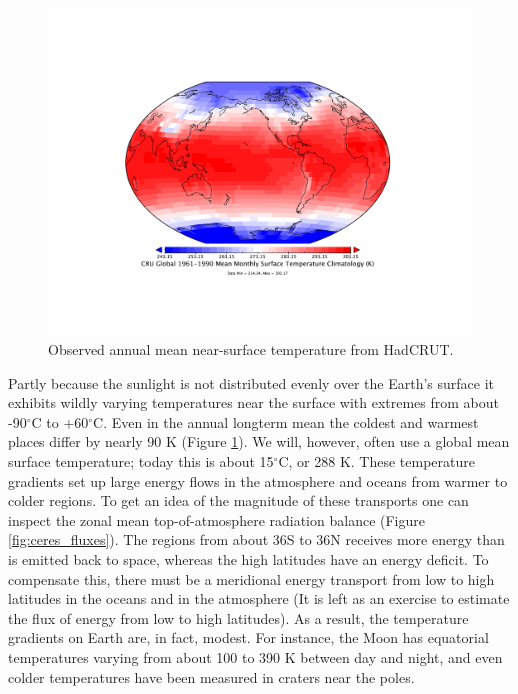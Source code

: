 \documentclass[12pt]{book}
\begin{document}

\begin{figure}
\begin{center}
\includegraphics[width=12 cm]{../external_figures/HadCRUT_absolute_timmean.pdf}
\end{center}
\caption{ Observed annual mean near-surface temperature from HadCRUT. } 
\label{fig:HadCRUT_temperature_map}
\end{figure}

Partly because the sunlight is not distributed evenly over the Earth's surface it exhibits wildly varying temperatures near the surface with extremes from about -90$^\circ$C to +60$^\circ$C. Even in the annual longterm mean the coldest and warmest places differ by nearly 90 K (Figure \ref{fig:HadCRUT_temperature_map}). We will, however, often use a global mean surface temperature; today this is about 15$^\circ$C, or 288 K. These temperature gradients set up large energy flows in the atmosphere and oceans from warmer to colder regions. To get an idea of the magnitude of these transports one can inspect the zonal mean top-of-atmosphere radiation balance (Figure \ref{fig:ceres_fluxes}). The regions from about 36S to 36N receives more energy than is emitted back to space, whereas the high latitudes have an energy deficit. To compensate this, there must be a meridional energy transport from low to high latitudes in the oceans and in the atmosphere (It is left as an exercise to estimate the flux of energy from low to high latitudes). As a result, the temperature gradients on Earth are, in fact, modest. For instance, the Moon has equatorial temperatures varying from about 100 to 390 K between day and night, and even colder temperatures have been measured in craters near the poles.
\end{document}
